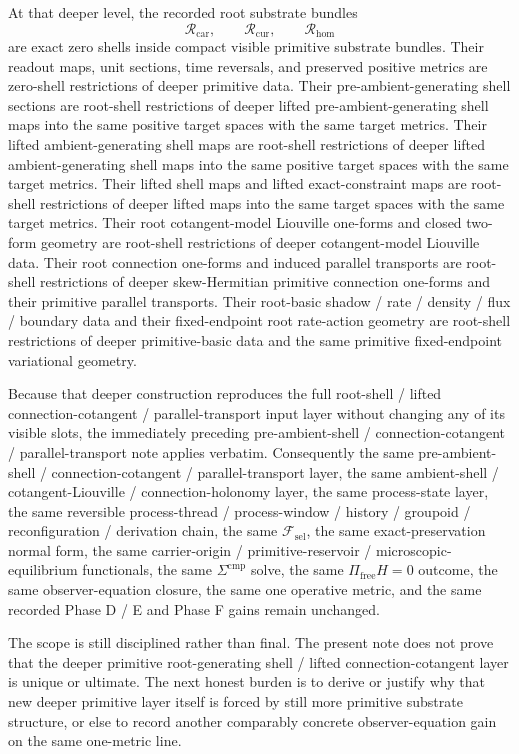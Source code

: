 \documentclass[11pt]{article}
\newcommand{\StemFunctional}{\mathscr F_{\mathrm{sel}}}
\newcommand{\TensorRootSpace}{\mathcal R_{\mathrm{car}}}
\newcommand{\CurRootSpace}{\mathcal R_{\mathrm{cur}}}
\newcommand{\HomRootSpace}{\mathcal R_{\mathrm{hom}}}
\begin{document}
At that deeper level, the recorded root substrate bundles
\[
\TensorRootSpace,\qquad
\CurRootSpace,\qquad
\HomRootSpace
\]
are exact zero shells inside compact visible primitive substrate bundles. Their readout maps, unit sections, time reversals, and preserved positive metrics are zero-shell restrictions of deeper primitive data. Their pre-ambient-generating shell sections are root-shell restrictions of deeper lifted pre-ambient-generating shell maps into the same positive target spaces with the same target metrics. Their lifted ambient-generating shell maps are root-shell restrictions of deeper lifted ambient-generating shell maps into the same positive target spaces with the same target metrics. Their lifted shell maps and lifted exact-constraint maps are root-shell restrictions of deeper lifted maps into the same target spaces with the same target metrics. Their root cotangent-model Liouville one-forms and closed two-form geometry are root-shell restrictions of deeper cotangent-model Liouville data. Their root connection one-forms and induced parallel transports are root-shell restrictions of deeper skew-Hermitian primitive connection one-forms and their primitive parallel transports. Their root-basic shadow / rate / density / flux / boundary data and their fixed-endpoint root rate-action geometry are root-shell restrictions of deeper primitive-basic data and the same primitive fixed-endpoint variational geometry.

Because that deeper construction reproduces the full root-shell / lifted connection-cotangent / parallel-transport input layer without changing any of its visible slots, the immediately preceding pre-ambient-shell / connection-cotangent / parallel-transport note applies verbatim. Consequently the same pre-ambient-shell / connection-cotangent / parallel-transport layer, the same ambient-shell / cotangent-Liouville / connection-holonomy layer, the same process-state layer, the same reversible process-thread / process-window / history / groupoid / reconfiguration / derivation chain, the same \(\StemFunctional\), the same exact-preservation normal form, the same carrier-origin / primitive-reservoir / microscopic-equilibrium functionals, the same \(\Sigma^{\mathrm{cmp}}\) solve, the same \(\Pi_{\mathrm{free}}H=0\) outcome, the same observer-equation closure, the same one operative metric, and the same recorded Phase D / E and Phase F gains remain unchanged.

The scope is still disciplined rather than final. The present note does not prove that the deeper primitive root-generating shell / lifted connection-cotangent layer is unique or ultimate. The next honest burden is to derive or justify why that new deeper primitive layer itself is forced by still more primitive substrate structure, or else to record another comparably concrete observer-equation gain on the same one-metric line.
\end{document}
